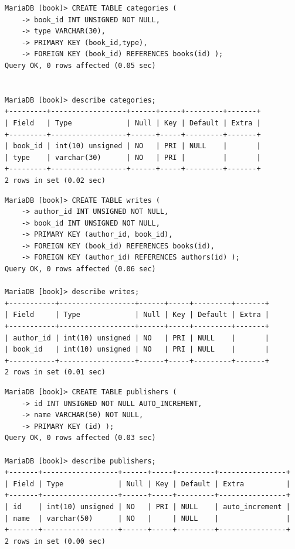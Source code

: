 \documentclass{assignment}
\begin{document}
\begin{verbatim}
MariaDB [book]> CREATE TABLE categories (
    -> book_id INT UNSIGNED NOT NULL,
    -> type VARCHAR(30),
    -> PRIMARY KEY (book_id,type),
    -> FOREIGN KEY (book_id) REFERENCES books(id) );
Query OK, 0 rows affected (0.05 sec)


MariaDB [book]> describe categories;
+---------+------------------+------+-----+---------+-------+
| Field   | Type             | Null | Key | Default | Extra |
+---------+------------------+------+-----+---------+-------+
| book_id | int(10) unsigned | NO   | PRI | NULL    |       |
| type    | varchar(30)      | NO   | PRI |         |       |
+---------+------------------+------+-----+---------+-------+
2 rows in set (0.02 sec)
\end{verbatim}

\begin{verbatim}
MariaDB [book]> CREATE TABLE writes ( 
    -> author_id INT UNSIGNED NOT NULL, 
    -> book_id INT UNSIGNED NOT NULL, 
    -> PRIMARY KEY (author_id, book_id), 
    -> FOREIGN KEY (book_id) REFERENCES books(id), 
    -> FOREIGN KEY (author_id) REFERENCES authors(id) );
Query OK, 0 rows affected (0.06 sec)

MariaDB [book]> describe writes;
+-----------+------------------+------+-----+---------+-------+
| Field     | Type             | Null | Key | Default | Extra |
+-----------+------------------+------+-----+---------+-------+
| author_id | int(10) unsigned | NO   | PRI | NULL    |       |
| book_id   | int(10) unsigned | NO   | PRI | NULL    |       |
+-----------+------------------+------+-----+---------+-------+
2 rows in set (0.01 sec)
\end{verbatim}

\begin{verbatim}
MariaDB [book]> CREATE TABLE publishers ( 
    -> id INT UNSIGNED NOT NULL AUTO_INCREMENT, 
    -> name VARCHAR(50) NOT NULL, 
    -> PRIMARY KEY (id) );
Query OK, 0 rows affected (0.03 sec)

MariaDB [book]> describe publishers;
+-------+------------------+------+-----+---------+----------------+
| Field | Type             | Null | Key | Default | Extra          |
+-------+------------------+------+-----+---------+----------------+
| id    | int(10) unsigned | NO   | PRI | NULL    | auto_increment |
| name  | varchar(50)      | NO   |     | NULL    |                |
+-------+------------------+------+-----+---------+----------------+
2 rows in set (0.00 sec)

\end{verbatim}
\end{document}
